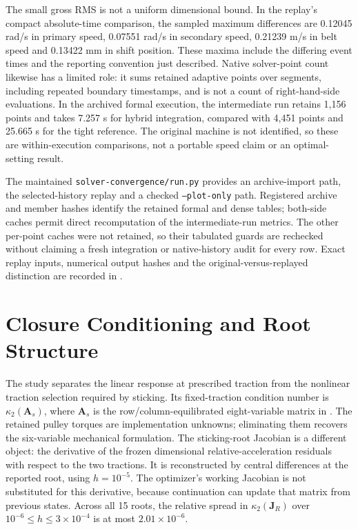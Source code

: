 \documentclass[11pt]{report}
\numberwithin{equation}{section}
\newcommand{\vect}[1]{\bm{#1}}
\begin{document}
The small gross RMS is not a uniform dimensional bound. In the replay's
compact absolute-time comparison, the sampled maximum differences are
0.12045 rad/s in primary speed, 0.07551 rad/s in secondary speed,
0.21239 m/s in belt speed and 0.13422 mm in shift position. These maxima
include the differing event times and the reporting convention just described.
Native solver-point count likewise has a limited role: it sums retained
adaptive points over segments, including repeated boundary timestamps, and is
not a count of right-hand-side evaluations. In the archived formal execution,
the intermediate run retains 1,156 points and takes 7.257 s for hybrid
integration, compared with 4,451 points and 25.665 s for the tight reference.
The original machine is not identified, so these are within-execution
comparisons, not a portable speed claim or an optimal-setting result.

The maintained \texttt{solver-convergence/run.py} provides an archive-import
path, the selected-history replay and a checked \texttt{--plot-only} path.
Registered archive and member hashes identify the retained formal and dense
tables; both-side caches permit direct recomputation of the intermediate-run
metrics. The other per-point caches were not retained, so their tabulated
guards are rechecked without claiming a fresh integration or native-history
audit for every row. Exact replay inputs, numerical output hashes and the
original-versus-replayed distinction are recorded in
.
\FloatBarrier

\section{Closure Conditioning and Root Structure}
\label{app:study_closure_conditioning}

The study separates the linear response at prescribed traction from the
nonlinear traction selection required by sticking. Its fixed-traction
condition number is \(\kappa_2(\vect A_s)\), where \(\vect A_s\) is the
row/column-equilibrated eight-variable matrix in
.
The retained pulley torques are implementation unknowns; eliminating them
recovers the six-variable mechanical formulation. The sticking-root
Jacobian is a different object: the derivative of the frozen dimensional
relative-acceleration residuals with respect to the two tractions.
It is reconstructed by central differences at the reported root, using
\(h=10^{-5}\). The optimizer's working Jacobian is not substituted for
this derivative, because continuation can update that matrix from previous
states. Across all 15 roots, the relative spread in \(\kappa_2(\vect J_R)\)
over \(10^{-6}\leq h\leq3\times10^{-4}\) is at most
\(2.01\times10^{-6}\).
\end{document}
